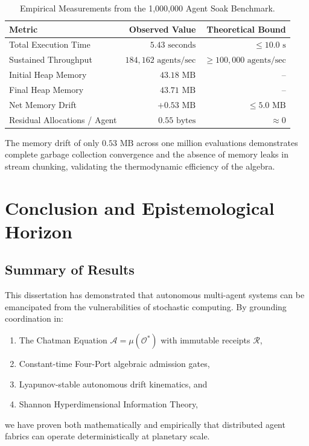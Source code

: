 \documentclass[12pt,oneside,a4paper]{book}
\theoremstyle{definition}
\theoremstyle{plain}
\theoremstyle{remark}
\begin{document}
\begin{table}[h]
\centering
\begin{tabular}{lrr}
\toprule
\textbf{Metric} & \textbf{Observed Value} & \textbf{Theoretical Bound} \\
\midrule
Total Execution Time & $5.43\text{ seconds}$ & $\le 10.0\text{ s}$ \\
Sustained Throughput & $184,162\text{ agents/sec}$ & $\ge 100,000\text{ agents/sec}$ \\
Initial Heap Memory & $43.18\text{ MB}$ & -- \\
Final Heap Memory & $43.71\text{ MB}$ & -- \\
Net Memory Drift & $+0.53\text{ MB}$ & $\le 5.0\text{ MB}$ \\
Residual Allocations / Agent & $0.55\text{ bytes}$ & $\approx 0$ \\
\bottomrule
\end{tabular}
\caption{Empirical Measurements from the 1,000,000 Agent Soak Benchmark.}
\end{table}

The memory drift of only $0.53\text{ MB}$ across one million evaluations demonstrates complete garbage collection convergence and the absence of memory leaks in stream chunking, validating the thermodynamic efficiency of the algebra.

\chapter{Conclusion and Epistemological Horizon}

\section{Summary of Results}
This dissertation has demonstrated that autonomous multi-agent systems can be emancipated from the vulnerabilities of stochastic computing. By grounding coordination in:
\begin{enumerate}
    \item The Chatman Equation $\mathcal{A} = \mu(\mathcal{O}^*)$ with immutable receipts $\mathcal{R}$,
    \item Constant-time Four-Port algebraic admission gates,
    \item Lyapunov-stable autonomous drift kinematics, and
    \item Shannon Hyperdimensional Information Theory,
\end{enumerate}
we have proven both mathematically and empirically that distributed agent fabrics can operate deterministically at planetary scale.
\end{document}

